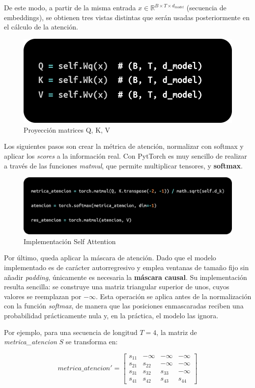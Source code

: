 \documentclass[11pt]{book}
\theoremstyle{plain}
\theoremstyle{definition}
\begin{document}
De este modo, a partir de la misma entrada $x \in \mathbb{R}^{B \times T \times d_{model}}$ 
(secuencia de embeddings), se obtienen tres vistas distintas que serán usadas 
posteriormente en el cálculo de la atención.

\begin{figure}[h]
    \centering
    \includegraphics[width=0.5\linewidth]{img/Q_K_V.png}
    \caption{Proyección matrices Q, K, V}
    \label{fig:Proyección8}
\end{figure}

Los siguientes pasos son crear la métrica de atención, normalizar con softmax y aplicar los \textit{scores} a la información real. Con PytTorch es muy sencillo de realizar a través de las funciones \textit{matmul}, que permite multiplicar tensores, y \textbf{softmax}. 

\begin{figure}[h]
    \centering
    \includegraphics[width=0.5\linewidth]{img/atencion.png}
    \caption{Implementación Self Attention}
    \label{fig:placeholder9}
\end{figure}

Por último, queda aplicar la máscara de atención. Dado que el modelo implementado es de carácter autorregresivo y emplea ventanas de tamaño fijo sin añadir \textit{padding}, únicamente es necesaria la \textbf{máscara causal}. Su implementación resulta sencilla: se construye una matriz triangular superior de unos, cuyos valores se reemplazan por $-\infty$. Esta operación se aplica antes de la normalización con la función \textit{softmax}, de manera que las posiciones enmascaradas reciben una probabilidad prácticamente nula y, en la práctica, el modelo las ignora.  

Por ejemplo, para una secuencia de longitud $T=4$, la matriz de \textit{metrica\_atencion} $S$ se transforma en:  

\[
metrica\_atencion' =
\begin{bmatrix}
s_{11} & -\infty & -\infty & -\infty \\
s_{21} & s_{22} & -\infty & -\infty \\
s_{31} & s_{32} & s_{33} & -\infty \\
s_{41} & s_{42} & s_{43} & s_{44}
\end{bmatrix}
\]
\end{document}
